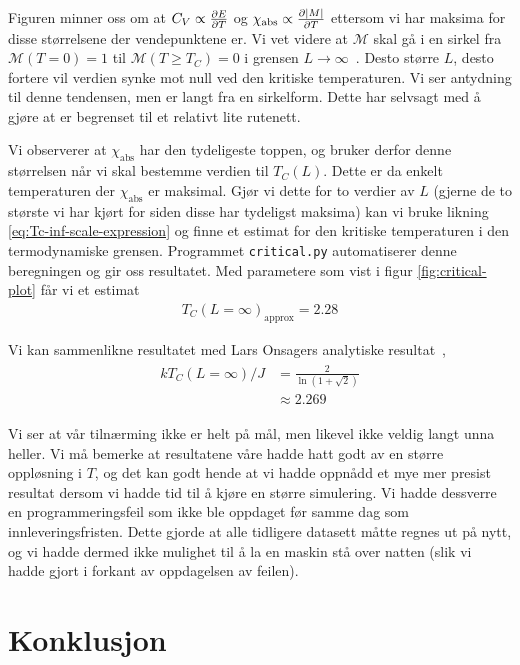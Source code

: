 \documentclass[11pt, twocolumn]{article}
\newcommand{\abs}[1]{|#1|}
\begin{document}
Figuren minner oss om at $C_V \propto \frac{\partial E}{\partial T}$ og $\chi_\text{abs}
\propto \pd{\abs{M}}{T}$ ettersom vi har maksima for disse størrelsene
der vendepunktene er. Vi vet videre at $\mathcal{M}$ skal gå i
en sirkel fra $\mathcal{M}(T=0)=1$ til $\mathcal{M}(T\geq T_C)=0$ i
grensen $L\rightarrow\infty$~\cite{ising-model-texas-uni}. Desto
større $L$, desto fortere vil verdien synke mot null ved den kritiske
temperaturen. Vi ser antydning til denne tendensen, men er langt fra
en sirkelform. Dette har selvsagt med å gjøre at er begrenset til et
relativt lite rutenett. 

Vi observerer at $\chi_\text{abs}$ har den tydeligeste toppen, og
bruker derfor denne størrelsen når vi skal bestemme verdien til
$T_C(L)$. Dette er da enkelt temperaturen der $\chi_\text{abs}$ er
maksimal. Gjør vi dette for to verdier av $L$ (gjerne de to største vi
har kjørt for siden disse har tydeligst maksima) kan vi bruke likning
\eqref{eq:Tc-inf-scale-expression} og finne et estimat for den
kritiske temperaturen i den termodynamiske grensen. Programmet
\texttt{critical.py} automatiserer denne beregningen og gir oss
resultatet. Med parametere som vist i figur \ref{fig:critical-plot}
får vi et estimat
\begin{align}
  T_C(L=\infty)_\text{approx} = 2.28
\end{align}

Vi kan sammenlikne resultatet med Lars Onsagers analytiske resultat~\cite{oppgavetekst-prosjekt-4},
\begin{align}
\begin{split}
  kT_C(L=\infty)/J &= \frac{ 2 }{ \ln \left( 1+\sqrt{2} \right) }\\
  &\approx 2.269
\end{split}
\end{align}

Vi ser at vår tilnærming ikke er helt på mål, men likevel ikke veldig
langt unna heller. Vi må bemerke at resultatene våre hadde hatt godt
av en større oppløsning i $T$, og det kan godt hende at vi hadde
oppnådd et mye mer presist resultat dersom vi hadde tid til å kjøre en
større simulering. Vi hadde dessverre en programmeringsfeil som ikke
ble oppdaget før samme dag som innleveringsfristen. Dette gjorde at
alle tidligere datasett måtte regnes ut på nytt, og vi hadde dermed
ikke mulighet til å la en maskin stå over natten (slik vi hadde gjort i
forkant av oppdagelsen av feilen). 

\section{Konklusjon}


\clearpage
\onecolumn
\printbibliography
\end{document}
